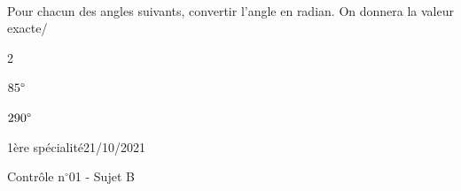 \documentclass[a4paper,12pt]{article}        %
\begin{document}
\\
Pour chacun des angles suivants, convertir l'angle en radian. On donnera la valeur exacte/
\begin{multicols}{2}
\begin{enumMet}
    \item $85\degree$
    \item $290\degree$
\end{enumMet}
\end{multicols}


\newpage
\vspace*{-1.5cm}
1ère spécialité\phantom{xxxxxxxxxxxxxxxxxxxxxxxxxxxxxxxxxxxxxxxxxxxxxxxxxxxxxxxxxxxxxxx}21/10/2021
{\begin{center}\Huge{Contrôle n$^{\circ}$01 - Sujet B}\end{center}}

\setcounter{exo}{1}
\end{document}
